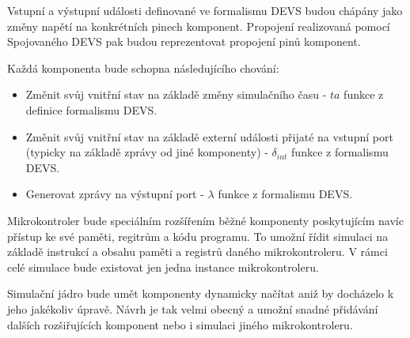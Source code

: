 Vstupní a výstupní události definované ve formalismu DEVS budou chápány jako změny napětí na konkrétních pinech komponent. Propojení realizovaná pomocí Spojovaného DEVS pak budou reprezentovat propojení pinů komponent.

Každá komponenta bude schopna následujícího chování:

\begin{itemize}
\item Změnit svůj vnitřní stav na základě změny simulačního času - $ta$ funkce z definice formalismu DEVS.
\item Změnit svůj vnitřní stav na základě externí události přijaté na vstupní port (typicky na základě zprávy od jiné komponenty) - $\delta_{int}$ funkce z formalismu DEVS.
\item Generovat zprávy na výstupní port - $\lambda$ funkce z formalismu DEVS.
\end{itemize}

Mikrokontroler bude speciálním rozšířením běžné komponenty poskytujícím navíc přístup ke své paměti, regitrům a kódu programu. To umožní řídit simulaci na základě instrukcí a obsahu paměti a registrů daného mikrokontroleru. V rámci celé simulace bude existovat jen jedna instance mikrokontroleru.

Simulační jádro bude umět komponenty dynamicky načítat aniž by docházelo k jeho jakékoliv úpravě. Návrh je tak velmi obecný a umožní snadné přidávání dalších rozšiřujících komponent nebo i simulaci jiného mikrokontroleru.

